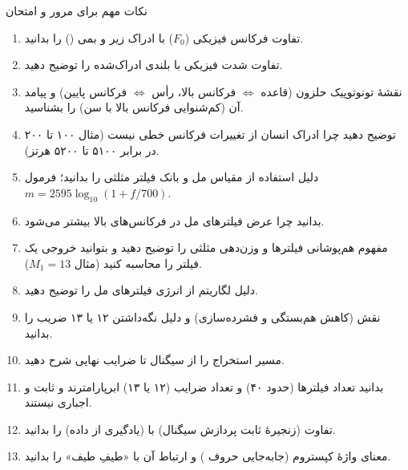 \begin{exambox}{نکات مهم برای مرور و امتحان}
\begin{enumerate}
  \item تفاوت فرکانس فیزیکی ($F_0$) با ادراک زیر و بمی () را بدانید.
  \item تفاوت شدت فیزیکی با بلندی ادراک‌شده را توضیح دهید.
  \item نقشهٔ تونوتوپیک حلزون (قاعده $\Leftrightarrow$ فرکانس بالا، رأس $\Leftrightarrow$ فرکانس پایین) و پیامد آن (کم‌شنوایی فرکانس بالا با سن) را بشناسید.
  \item توضیح دهید چرا ادراک انسان از تغییرات فرکانس خطی نیست (مثال ۱۰۰ تا ۲۰۰ در برابر ۵۱۰۰ تا ۵۲۰۰ هرتز).
  \item دلیل استفاده از مقیاس مل و بانک فیلتر مثلثی را بدانید؛ فرمول $m=2595\log_{10}(1+f/700)$.
  \item بدانید چرا عرض فیلترهای مل در فرکانس‌های بالا بیشتر می‌شود.
  \item مفهوم هم‌پوشانی فیلترها و وزن‌دهی مثلثی را توضیح دهید و بتوانید خروجی یک فیلتر را محاسبه کنید (مثال $M_1=13$).
  \item دلیل لگاریتم از انرژی فیلترهای مل را توضیح دهید.
  \item نقش  (کاهش هم‌بستگی و فشرده‌سازی) و دلیل نگه‌داشتن ۱۲ یا ۱۳ ضریب را بدانید.
  \item مسیر استخراج  را از سیگنال تا ضرایب نهایی شرح دهید.
  \item بدانید تعداد فیلترها (حدود ۴۰) و تعداد ضرایب (۱۲ یا ۱۳) ابرپارامترند و ثابت و اجباری نیستند.
  \item تفاوت  (زنجیرهٔ ثابت پردازش سیگنال) با  (یادگیری از داده) را بدانید.
  \item معنای واژهٔ کپستروم (جابه‌جایی حروف ) و ارتباط آن با «طیفِ طیف» را بدانید.
\end{enumerate}
\end{exambox}
